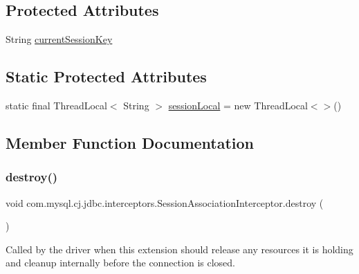 \subsection*{Protected Attributes}
\begin{DoxyCompactItemize}
\item 
String \mbox{\hyperlink{classcom_1_1mysql_1_1cj_1_1jdbc_1_1interceptors_1_1_session_association_interceptor_a804bc59a162ecabfc4a6205e5da27955}{current\+Session\+Key}}
\end{DoxyCompactItemize}
\subsection*{Static Protected Attributes}
\begin{DoxyCompactItemize}
\item 
static final Thread\+Local$<$ String $>$ \mbox{\hyperlink{classcom_1_1mysql_1_1cj_1_1jdbc_1_1interceptors_1_1_session_association_interceptor_a13d158ba1aa03473494a82edfd567ff5}{session\+Local}} = new Thread\+Local$<$$>$()
\end{DoxyCompactItemize}


\subsection{Member Function Documentation}
\mbox{\label{classcom_1_1mysql_1_1cj_1_1jdbc_1_1interceptors_1_1_session_association_interceptor_a2bbe0b1b240f2ab943ba68fe979cf3a9}} 
\subsubsection{\texorpdfstring{destroy()}{destroy()}}
{\footnotesize\ttfamily void com.\+mysql.\+cj.\+jdbc.\+interceptors.\+Session\+Association\+Interceptor.\+destroy (\begin{DoxyParamCaption}{ }\end{DoxyParamCaption})}

Called by the driver when this extension should release any resources it is holding and cleanup internally before the connection is closed. 

